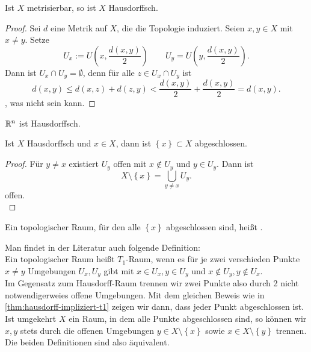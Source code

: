 \begin{theorem}\label{thm:metrisierbarer-raum-ist-hausdorff}
    Ist $X$ metrisierbar, so ist  $X$ Hausdorffsch.
\end{theorem}
\begin{proof}
    Sei $d$ eine Metrik auf  $X$, die die Topologie induziert. Seien  $x,y\in X$ mit $x\neq y$. Setze
    \[
        U_x := U\left( x, \frac{d(x,y)}{2} \right) \qquad U_y = U\left( y, \frac{d(x,y)}{2} \right) 
    .\] 
    Dann ist $U_x \cap U_y = \emptyset$, denn für alle $z\in U_x \cap U_y$ ist
    \[
        d(x,y) \leq  d(x,z) + d(z,y) < \frac{d(x,y)}{2} + \frac{d(x,y)}{2} = d(x,y)
    .\] 
    , was nicht sein kann.
\end{proof}
\begin{example}
    $\mathbb{R}^n$ ist Hausdorffsch.
\end{example}
\begin{theorem}\label{thm:hausdorff-impliziert-t1}
    Ist $X$ Hausdorffsch und  $x\in X$, dann ist $\left \{x\right\} \subset X$ abgeschlossen.
\end{theorem}
\begin{proof}
    Für $y\neq x$ existiert $U_y$ offen mit  $x\not\in U_y$ und $y\in U_y$. Dann ist
    \[
    X \setminus \left \{x\right\}  = \bigcup_{y\neq x} U_y 
    .\] 
    offen. \\
\end{proof}
    \begin{minipage}{\textwidth}
        \centering
    \end{minipage}
\begin{remark}
    Ein topologischer Raum, für den alle $\left \{x\right\} $ abgeschlossen sind, heißt .
\end{remark}
\begin{remark*}
    Man findet in der Literatur auch folgende Definition: \\
    Ein topologischer Raum heißt $T_1$-Raum, wenn es für je zwei verschieden Punkte $x\neq y$ Umgebungen $U_x,U_y$ gibt mit  $x\in U_x, y\in U_y$ und $x\not\in U_y, y\not\in U_x$. \\
    Im Gegensatz zum Hausdorff-Raum trennen wir zwei Punkte also durch 2 nicht notwendigerweies offene Umgebungen. Mit dem gleichen Beweis wie in \autoref{thm:hausdorff-impliziert-t1} zeigen wir dann, dass jeder Punkt abgeschlossen ist. Ist umgekehrt $X$ ein Raum, in dem alle Punkte abgeschlossen sind, so können wir  $x,y$ stets durch die offenen Umgebungen  $y\in X \setminus \left \{x\right\} $ sowie $x\in X \setminus \left \{y\right\} $ trennen. Die beiden Definitionen sind also äquivalent.


    \begin{minipage}{\textwidth}
    \end{minipage}
\end{remark*}



